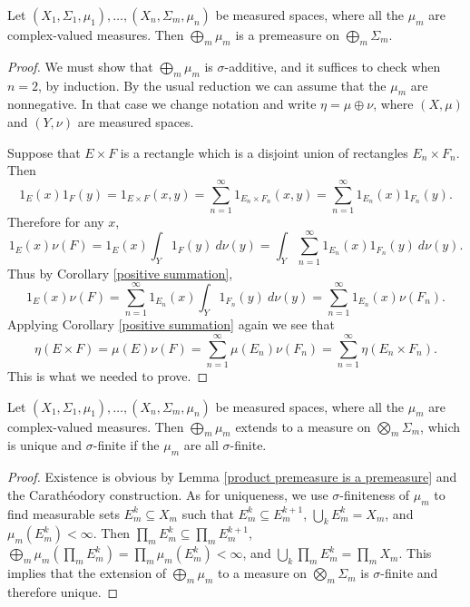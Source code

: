 \begin{lemma}
\label{product premeasure is a premeasure}
Let $(X_1, \Sigma_1, \mu_1), \dots, (X_{n}, \Sigma_{m}, \mu_{n})$ be measured spaces, where all the $\mu_{m}$ are complex-valued measures.
Then $\bigoplus_{m} \mu_{m}$ is a premeasure on $\bigoplus_{m} \Sigma_{m}$.
\end{lemma}
\begin{proof}
We must show that $\bigoplus_{m} \mu_{m}$ is $\sigma$-additive, and it suffices to check when $n = 2$, by induction.
By the usual reduction we can assume that the $\mu_{m}$ are nonnegative.
In that case we change notation and write $\eta = \mu \oplus \nu$, where $(X, \mu)$ and $(Y, \nu)$ are measured spaces.

Suppose that $E \times F$ is a rectangle which is a disjoint union of rectangles $E_{n} \times F_{n}$.
Then
\[1_E(x) 1_F(y) = 1_{E \times F}(x, y) = \sum_{n=1}^{\infty} 1_{E_{n} \times F_{n}}(x, y) = \sum_{n=1}^{\infty} 1_{E_{n}}(x) 1_{F_{n}}(y).\]
Therefore for any $x$,
\[1_E(x) \nu(F) = 1_E(x) \int_{Y} 1_F(y)~d\nu(y) = \int_{Y} \sum_{n=1}^{\infty} 1_{E_{n}}(x) 1_{F_{n}}(y) ~d\nu(y).\]
Thus by Corollary \ref{positive summation},
\[1_E(x) \nu(F) = \sum_{n=1}^{\infty} 1_{E_{n}}(x) \int_{Y} 1_{F_{n}}(y)~d\nu(y) = \sum_{n=1}^{\infty} 1_{E_{n}}(x)\nu(F_{n}).\]
Applying Corollary \ref{positive summation} again we see that
\[\eta(E \times F) = \mu(E) \nu(F) = \sum_{n=1}^{\infty} \mu(E_{n}) \nu(F_{n}) = \sum_{n=1}^{\infty} \eta(E_{n} \times F_{n}).\]
This is what we needed to prove.
\end{proof}

\begin{corollary}
Let $(X_1, \Sigma_1, \mu_1), \dots, (X_{n}, \Sigma_{m}, \mu_{n})$ be measured spaces, where all the $\mu_{m}$ are complex-valued measures.
Then $\bigoplus_{m} \mu_{m}$ extends to a measure on $\bigotimes_{m} \Sigma_{m}$, which is unique and $\sigma$-finite if the $\mu_{m}$ are all $\sigma$-finite.
\end{corollary}
\begin{proof}
Existence is obvious by Lemma \ref{product premeasure is a premeasure} and the Carathéodory construction.
As for uniqueness, we use $\sigma$-finiteness of $\mu_{m}$ to find measurable sets $E_{m}^{k} \subseteq X_{m}$ such that $E_{m}^{k} \subseteq E_{m}^{k+1}$, $\bigcup_{k} E_{m}^{k} = X_{m}$, and $\mu_{m}(E_{m}^k) < \infty$.
Then $\prod_{m} E_{m}^{k} \subseteq \prod_{m} E_{m}^{k+1}$, $\bigoplus_{m} \mu_{m}(\prod_{m} E_{m}^k) = \prod_{m} \mu_{m}(E_{m}^k) < \infty$, and $\bigcup_{k} \prod_{m} E_{m}^{k} = \prod_{m} X_{m}$.
This implies that the extension of $\bigoplus_{m} \mu_{m}$ to a measure on $\bigotimes_{m} \Sigma_{m}$ is $\sigma$-finite and therefore unique.
\end{proof}

